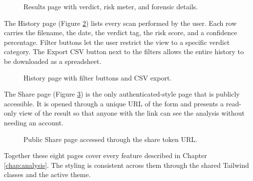 \begin{figure}[H]
\centering
{}
\caption{Results page with verdict, risk meter, and forensic details.}
\label{fig:ui-results}
\end{figure}

The History page (Figure \ref{fig:ui-history}) lists every scan performed by the user. Each row carries the filename, the date, the verdict tag, the risk score, and a confidence percentage. Filter buttons let the user restrict the view to a specific verdict category. The Export CSV button next to the filters allows the entire history to be downloaded as a spreadsheet.

\begin{figure}[H]
\centering
{}
\caption{History page with filter buttons and CSV export.}
\label{fig:ui-history}
\end{figure}

The Share page (Figure \ref{fig:ui-share}) is the only authenticated-style page that is publicly accessible. It is opened through a unique URL of the form  and presents a read-only view of the result so that anyone with the link can see the analysis without needing an account.

\begin{figure}[H]
\centering
{}
\caption{Public Share page accessed through the share token URL.}
\label{fig:ui-share}
\end{figure}

Together these eight pages cover every feature described in Chapter \ref{chap:analysis}. The styling is consistent across them through the shared Tailwind classes and the active theme.

